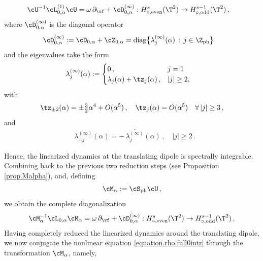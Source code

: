 \documentclass[a4paper,reqno,10pt]{article}
\newcommand{\pa}{\partial}
\begin{document}
\begin{itemize}
\begin{align}
		&  \cU^{-1} \cL_{0,\alpha}^{(1)} \cU = \omega\,\pa_{\vf} + \cD_{0,\alpha}^{(\infty)} :H_{\circ,{\rm even}}^s(\T^2) \to H_{\circ,{\rm odd}}^{s-1}(\T^2) \,,
	\end{align}
	where $\cD_{0,\alpha}^{(\infty)} $ is the diagonal operator
	\begin{align*}
		\cD_{0,\alpha}^{(\infty)} & := \cD_{0,\alpha} + \cZ_{0,\alpha} =  {\rm diag}\big\{ \lambda_{j}^{(\infty)}(\alpha) \, : \, j\in\Z_{\rm ph} \big\}
        \end{align*}
        and the eigenvalues take the form
        \begin{align}\label{frequency.intro}
		\lambda_{j}^{(\infty)}(\alpha) &:= \begin{cases}
			0\,, & j= 1 \\
			\lambda_{j}(\alpha) + \tz_{j}(\alpha) \,, & |j|\geq 2,
		\end{cases} 
	\end{align}
	with 
    \begin{equation}\label{mode.2.asympt.intro}
        \tz_{\pm 2}(\alpha) = \pm \tfrac32 \alpha^4 + O(\alpha^5) \,, \quad \tz_{j}(\alpha) = O(\alpha^5) \quad \forall \, |j|\geq 3\,,
    \end{equation}
    and 
		\begin{align}
			&	\lambda_{-j}^{(\infty)}(\alpha)=	-\,\overline{\lambda_{j}^{(\infty)}}(\alpha) \,, 
			\quad |j|\geq 2\,.
		\end{align} 
\end{itemize}
    Hence, the linearized dynamics at the translating dipole is spectrally integrable. 
     Combining back to the previous two reduction steps (see Proposition \ref{prop.Malpha}), and, defining
\begin{equation*}
	\cM_{\alpha} := \cS_{\rm ph} \cU \,,
\end{equation*}
we obtain the complete diagonalization
\begin{equation*}
	\cM_{\alpha}^{-1} \cL_{0,\alpha} \cM_{\alpha}
	= \omega\,\pa_{\vf} + \cD_{0,\alpha}^{(\infty)}
	: H_{\circ,{\rm even}}^{s}(\T^2)
	\to H_{\circ,{\rm odd}}^{s-1} (\T^2)\,.
\end{equation*}
Having completely reduced the linearized dynamics around the translating dipole, we now conjugate the nonlinear equation \eqref{equation.rho.full0intr} through the transformation $\cM_{\alpha}$, namely,
\end{document}
